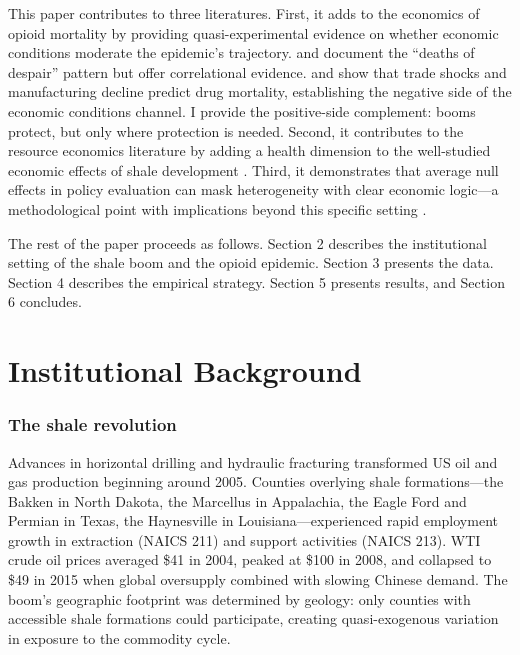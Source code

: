 \documentclass[12pt]{article}
\begin{document}
This paper contributes to three literatures. First, it adds to the economics of opioid mortality by providing quasi-experimental evidence on whether economic conditions moderate the epidemic's trajectory. \citet{case2015} and \citet{case2017} document the ``deaths of despair'' pattern but offer correlational evidence. \citet{pierce2020} and \citet{charles2019} show that trade shocks and manufacturing decline predict drug mortality, establishing the negative side of the economic conditions channel. I provide the positive-side complement: booms protect, but only where protection is needed. Second, it contributes to the resource economics literature by adding a health dimension to the well-studied economic effects of shale development \citep{feyrer2017, allcott2018, bartik2019, weber2012, jacobsen2014}. Third, it demonstrates that average null effects in policy evaluation can mask heterogeneity with clear economic logic---a methodological point with implications beyond this specific setting \citep{heckman2001}.

The rest of the paper proceeds as follows. Section 2 describes the institutional setting of the shale boom and the opioid epidemic. Section 3 presents the data. Section 4 describes the empirical strategy. Section 5 presents results, and Section 6 concludes.


\section{Institutional Background}

\subsubsection*{The shale revolution} Advances in horizontal drilling and hydraulic fracturing transformed US oil and gas production beginning around 2005. Counties overlying shale formations---the Bakken in North Dakota, the Marcellus in Appalachia, the Eagle Ford and Permian in Texas, the Haynesville in Louisiana---experienced rapid employment growth in extraction (NAICS 211) and support activities (NAICS 213). WTI crude oil prices averaged \$41 in 2004, peaked at \$100 in 2008, and collapsed to \$49 in 2015 when global oversupply combined with slowing Chinese demand. The boom's geographic footprint was determined by geology: only counties with accessible shale formations could participate, creating quasi-exogenous variation in exposure to the commodity cycle.
\end{document}
